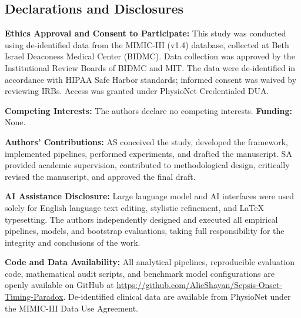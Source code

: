 \documentclass[12pt,a4paper]{article}
\begin{document}
\begin{singlespace}
\fontsize{9.0pt}{11.0pt}\selectfont

\subsection*{Declarations and Disclosures}

\noindent\textbf{Ethics Approval and Consent to Participate:} This study was conducted using de-identified data from the MIMIC-III (v1.4) database, collected at Beth Israel Deaconess Medical Center (BIDMC). Data collection was approved by the Institutional Review Boards of BIDMC and MIT. The data were de-identified in accordance with HIPAA Safe Harbor standards; informed consent was waived by reviewing IRBs. Access was granted under PhysioNet Credentialed DUA.

\vspace{0.2em}
\noindent\textbf{Competing Interests:} The authors declare no competing interests. \quad \textbf{Funding:} None.

\vspace{0.2em}
\noindent\textbf{Authors' Contributions:} AS conceived the study, developed the framework, implemented pipelines, performed experiments, and drafted the manuscript. SA provided academic supervision, contributed to methodological design, critically revised the manuscript, and approved the final draft.

\vspace{0.2em}
\noindent\textbf{AI Assistance Disclosure:} Large language model and AI interfaces were used solely for English language text editing, stylistic refinement, and LaTeX typesetting. The authors independently designed and executed all empirical pipelines, models, and bootstrap evaluations, taking full responsibility for the integrity and conclusions of the work.

\vspace{0.2em}
\noindent\textbf{Code and Data Availability:} All analytical pipelines, reproducible evaluation code, mathematical audit scripts, and benchmark model configurations are openly available on GitHub at \url{https://github.com/AlieShayan/Sepsis-Onset-Timing-Paradox}. De-identified clinical data are available from PhysioNet under the MIMIC-III Data Use Agreement.


\end{singlespace}
\end{document}
